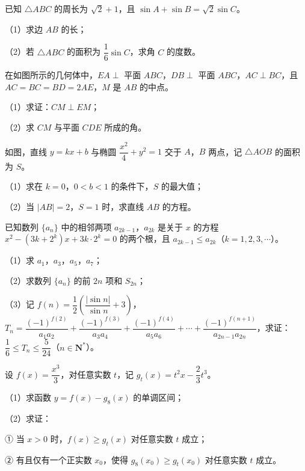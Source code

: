 \begin{question}
已知 $\triangle ABC$ 的周长为 $\sqrt2+1$，且 $\sin A+\sin B=\sqrt2\sin C$。

（1）求边 $AB$ 的长；

（2）若 $\triangle ABC$ 的面积为 $\dfrac16\sin C$，求角 $C$ 的度数。

\Needspace{0.4\textheight}
\end{question}
\begin{question}
在如图所示的几何体中，$EA\perp$ 平面 $ABC$，$DB\perp$ 平面 $ABC$，$AC\perp BC$，且 $AC=BC=BD=2AE$，$M$ 是 $AB$ 的中点。

（1）求证：$CM\perp EM$；

（2）求 $CM$ 与平面 $CDE$ 所成的角。
\nopagebreak[4]
\begin{center}\end{center}
\nopagebreak[4]
\Needspace{0.4\textheight}
\end{question}
\begin{question}
如图，直线 $y=kx+b$ 与椭圆 $\dfrac{x^2}{4}+y^2=1$ 交于 $A$，$B$ 两点，记 $\triangle AOB$ 的面积为 $S$。

（1）求在 $k=0$，$0<b<1$ 的条件下，$S$ 的最大值；

（2）当 $|AB|=2$，$S=1$ 时，求直线 $AB$ 的方程。
\nopagebreak[4]
\begin{center}\end{center}
\nopagebreak[4]
\end{question}
\begin{question}
已知数列 $\{a_n\}$ 中的相邻两项 $a_{2k-1}$，$a_{2k}$ 是关于 $x$ 的方程 $x^2-(3k+2^k)x+3k\cdot2^k=0$ 的两个根，且 $a_{2k-1}\leqslant a_{2k}$（$k=1,2,3,\cdots$）。

（1）求 $a_1$，$a_3$，$a_5$，$a_7$；

（2）求数列 $\{a_n\}$ 的前 $2n$ 项和 $S_{2n}$；

（3）记 $f(n)=\dfrac12\left(\dfrac{|\sin n|}{\sin n}+3\right)$，$T_n=\dfrac{(-1)^{f(2)}}{a_1a_2}+\dfrac{(-1)^{f(3)}}{a_3a_4}+\dfrac{(-1)^{f(4)}}{a_5a_6}+\cdots+\dfrac{(-1)^{f(n+1)}}{a_{2n-1}a_{2n}}$，求证：$\dfrac16\leqslant T_n\leqslant\dfrac5{24}$（$n\in\mathbf N^*$）。

\end{question}
\begin{question}
设 $f(x)=\dfrac{x^3}{3}$，对任意实数 $t$，记 $g_t(x)=t^2x-\dfrac23t^3$。

（1）求函数 $y=f(x)-g_8(x)$ 的单调区间；

（2）求证：

① 当 $x>0$ 时，$f(x)\geqslant g_t(x)$ 对任意实数 $t$ 成立；

② 有且仅有一个正实数 $x_0$，使得 $g_8(x_0)\geqslant g_t(x_0)$ 对任意实数 $t$ 成立。

\end{question}